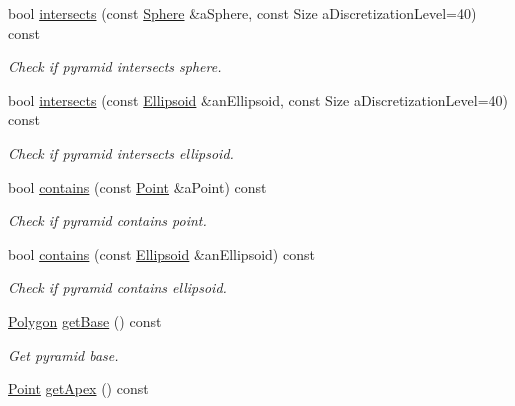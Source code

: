 \begin{DoxyCompactItemize}
bool \hyperlink{classostk_1_1math_1_1geom_1_1d3_1_1objects_1_1_pyramid_a8e9f9ddc9d4442b00c7408b0651a1351}{intersects} (const \hyperlink{classostk_1_1math_1_1geom_1_1d3_1_1objects_1_1_sphere}{Sphere} \&a\+Sphere, const Size a\+Discretization\+Level=40) const
\begin{DoxyCompactList}\small\item\em Check if pyramid intersects sphere. \end{DoxyCompactList}\item 
bool \hyperlink{classostk_1_1math_1_1geom_1_1d3_1_1objects_1_1_pyramid_ac4afbaf10989f5fcfb260ede0af34f19}{intersects} (const \hyperlink{classostk_1_1math_1_1geom_1_1d3_1_1objects_1_1_ellipsoid}{Ellipsoid} \&an\+Ellipsoid, const Size a\+Discretization\+Level=40) const
\begin{DoxyCompactList}\small\item\em Check if pyramid intersects ellipsoid. \end{DoxyCompactList}\item 
bool \hyperlink{classostk_1_1math_1_1geom_1_1d3_1_1objects_1_1_pyramid_a7f476c37cc3f014bdc24e7fa4f2da743}{contains} (const \hyperlink{classostk_1_1math_1_1geom_1_1d3_1_1objects_1_1_point}{Point} \&a\+Point) const
\begin{DoxyCompactList}\small\item\em Check if pyramid contains point. \end{DoxyCompactList}\item 
bool \hyperlink{classostk_1_1math_1_1geom_1_1d3_1_1objects_1_1_pyramid_a761592bada278f4a80f910e3e234fde8}{contains} (const \hyperlink{classostk_1_1math_1_1geom_1_1d3_1_1objects_1_1_ellipsoid}{Ellipsoid} \&an\+Ellipsoid) const
\begin{DoxyCompactList}\small\item\em Check if pyramid contains ellipsoid. \end{DoxyCompactList}\item 
\hyperlink{classostk_1_1math_1_1geom_1_1d3_1_1objects_1_1_polygon}{Polygon} \hyperlink{classostk_1_1math_1_1geom_1_1d3_1_1objects_1_1_pyramid_ae1f35fb024a1cd171b750170cb1df0a4}{get\+Base} () const
\begin{DoxyCompactList}\small\item\em Get pyramid base. \end{DoxyCompactList}\item 
\hyperlink{classostk_1_1math_1_1geom_1_1d3_1_1objects_1_1_point}{Point} \hyperlink{classostk_1_1math_1_1geom_1_1d3_1_1objects_1_1_pyramid_acbc557f7d8bbfe1fc3f59fdad16684a3}{get\+Apex} () const

\end{DoxyCompactItemize}

